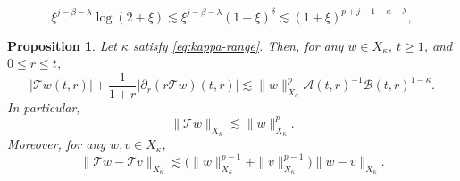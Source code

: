 \documentclass[10pt,a4paper]{amsart}
\newtheorem{proposition}{Proposition}
\newcommand{\Acal}{\mathcal A}
\newcommand{\Bcal}{\mathcal B}
\newcommand{\Tcal}{\mathcal T}
\newcommand{\f}{\frac}
\newcommand{\p}{\partial}
\begin{document}
\begin{equation}\label{DELTA}
\xi^{j-\beta-\lambda}\log(2+\xi)
\lesssim
\xi^{j-\beta-\lambda}(1+\xi)^\delta
\lesssim
(1+\xi)^{p+j-1-\kappa-\lambda},
\end{equation}

\begin{proposition}
\label{prop:nonlinear}
Let $\kappa$ satisfy \eqref{eq:kappa-range}. Then, for any
$w\in X_\kappa$, $t\geq1$, and $0\leq r\leq t$,
\begin{equation}
\label{qq:47}
|\Tcal w(t,r)|
+
\f{1}{1+r}
\left|
\p_r(r\Tcal w)(t,r)
\right|
\lesssim
\|w\|_{X_\kappa}^{p}
\Acal(t,r)^{-1}\Bcal(t,r)^{1-\kappa}.
\end{equation}
In particular,
\begin{equation}
\label{qq:48}
\|\Tcal w\|_{X_\kappa}
\lesssim
\|w\|_{X_\kappa}^{p}.
\end{equation}
Moreover, for any $w,v\in X_\kappa$,
\begin{equation}
\label{qq:49}
\|\Tcal w-\Tcal v\|_{X_\kappa}
\lesssim
\big(
\|w\|_{X_\kappa}^{p-1}
+
\|v\|_{X_\kappa}^{p-1}
\big)
\|w-v\|_{X_\kappa}.
\end{equation}
\end{proposition}
\end{document}
